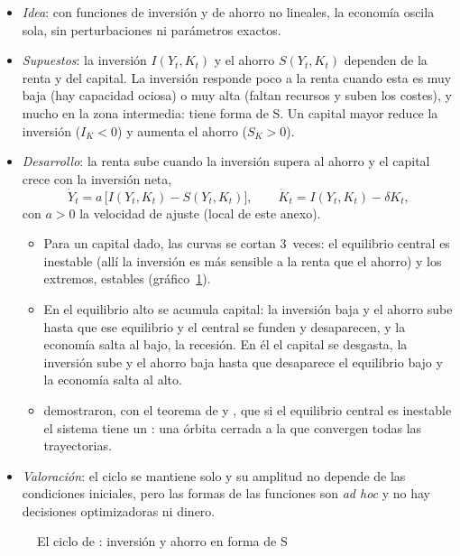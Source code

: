 \documentclass[11pt]{article}
\begin{document}
\begin{itemize}
\item \emph{Idea}: con funciones de inversión y de ahorro no lineales, la economía oscila sola, sin perturbaciones ni parámetros exactos\nocite{Kaldor1940Model}.
\item \emph{Supuestos}: la inversión $I(Y_t,K_t)$ y el ahorro $S(Y_t,K_t)$ dependen de la renta y del capital. La inversión responde poco a la renta cuando esta es muy baja (hay capacidad ociosa) o muy alta (faltan recursos y suben los costes), y mucho en la zona intermedia: tiene forma de S. Un capital mayor reduce la inversión ($I_K<0$) y aumenta el ahorro ($S_K>0$).
\item \emph{Desarrollo}: la renta sube cuando la inversión supera al ahorro y el capital crece con la inversión neta,
  \begin{equation*}
  \dot Y_t=a\,\big[I(Y_t,K_t)-S(Y_t,K_t)\big],\qquad \dot K_t=I(Y_t,K_t)-\delta K_t ,
  \end{equation*}
  con $a>0$ la velocidad de ajuste (local de este anexo).
  \begin{itemize}
  \item Para un capital dado, las curvas se cortan 3~veces: el equilibrio central es inestable (allí la inversión es más sensible a la renta que el ahorro) y los extremos, estables (gráfico~\ref{fig:kaldor}).
  \item En el equilibrio alto se acumula capital: la inversión baja y el ahorro sube hasta que ese equilibrio y el central se funden y desaparecen, y la economía salta al bajo, la recesión. En él el capital se desgasta, la inversión sube y el ahorro baja hasta que desaparece el equilibrio bajo y la economía salta al alto.
  \item \textcite{ChangSmyth1971Existence} demostraron, con el teorema de  y , que si el equilibrio central es inestable el sistema tiene un : una órbita cerrada a la que convergen todas las trayectorias.
  \end{itemize}
\item \emph{Valoración}: el ciclo se mantiene solo y su amplitud no depende de las condiciones iniciales, pero las formas de las funciones son \emph{ad hoc} y no hay decisiones optimizadoras ni dinero.
\end{itemize}

\begin{figure}[H]
\centering
\caption{El ciclo de : inversión y ahorro en forma de S}\label{fig:kaldor}
\end{figure}
\end{document}
